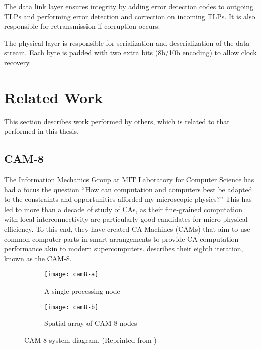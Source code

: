 The data link layer ensures integrity by adding error detection codes to outgoing TLPs and performing error detection and correction on incoming TLPs.
It is also responsible for retransmission if corruption occurs.

The physical layer is responsible for serialization and deserialization of the data stream.
Each byte is padded with two extra bits (8b/10b encoding) to allow clock recovery.


\section{Related Work}

This section describes work performed by others, which is related to that performed in this thesis.


\subsection{CAM-8}

The Information Mechanics Group at MIT Laboratory for Computer Science has had a focus the question ``How can computation and computers best be adapted to the constraints and opportunities afforded my microscopic physics?''
This has led to more than a decade of study of CAs, as their fine-grained computation with local interconnectivity are particularly good candidates for micro-physical efficiency.
To this end, they have created CA Machines (CAMs) that aim to use common computer parts in smart arrangements to provide CA computation performance akin to modern supercomputers.
\cite{margolus1996cam8} describes their eighth iteration, known as the CAM-8.

\begin{figure}[!ht]
    \centering
    \begin{subfigure}{0.48\textwidth}
        \centering
        \texttt{[image: cam8-a]}
        \caption{A single processing node}
    \end{subfigure}
    \begin{subfigure}{0.48\textwidth}
        \centering
        \texttt{[image: cam8-b]}
        \caption{Spatial array of CAM-8 nodes}
    \end{subfigure}
    \caption[CAM-8 system diagram]{
        CAM-8 system diagram.
        (Reprinted from \cite{margolus1996cam8})
    }
    \label{fig:cam-8}
\end{figure}

